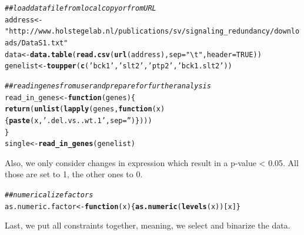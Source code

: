 \documentclass[paper=a4,notitlepage,DIV=12]{scrartcl}\usepackage[]{graphicx}\usepackage[]{color}
\makeatletter
\newcommand{\hlnum}[1]{\textcolor[rgb]{0.686,0.059,0.569}{#1}}%
\newcommand{\hlstr}[1]{\textcolor[rgb]{0.192,0.494,0.8}{#1}}%
\newcommand{\hlcom}[1]{\textcolor[rgb]{0.678,0.584,0.686}{\textit{#1}}}%
\newcommand{\hlstd}[1]{\textcolor[rgb]{0.345,0.345,0.345}{#1}}%
\newcommand{\hlkwa}[1]{\textcolor[rgb]{0.161,0.373,0.58}{\textbf{#1}}}%
\newcommand{\hlkwb}[1]{\textcolor[rgb]{0.69,0.353,0.396}{#1}}%
\newcommand{\hlkwc}[1]{\textcolor[rgb]{0.333,0.667,0.333}{#1}}%
\newcommand{\hlkwd}[1]{\textcolor[rgb]{0.737,0.353,0.396}{\textbf{#1}}}%
\newenvironment{kframe}{%
 \def\at@end@of@kframe{}%
 \ifinner\ifhmode%
  \def\at@end@of@kframe{\end{minipage}}%
  \begin{minipage}{\columnwidth}%
 \fi\fi%
 \def\FrameCommand##1{\hskip\@totalleftmargin \hskip-\fboxsep
 \colorbox{shadecolor}{##1}\hskip-\fboxsep
     \hskip-\linewidth \hskip-\@totalleftmargin \hskip\columnwidth}%
 \MakeFramed {\advance\hsize-\width
   \@totalleftmargin\z@ \linewidth\hsize
   \@setminipage}}%
 {\par\unskip\endMakeFramed%
 \at@end@of@kframe}
\newenvironment{knitrout}{}{} %
\makeatother
\begin{document}
\begin{knitrout}
\color{fgcolor}\begin{kframe}
\begin{alltt}
\hlcom{## load data file from local copy or from URL}
\hlstd{address} \hlkwb{<-}
  \hlstr{"http://www.holstegelab.nl/publications/sv/signaling_redundancy/downloads/DataS1.txt"}
\hlstd{data} \hlkwb{<-} \hlkwd{data.table}\hlstd{(}\hlkwd{read.csv}\hlstd{(}\hlkwd{url}\hlstd{(address),} \hlkwc{sep}\hlstd{=}\hlstr{"\textbackslash{}t"}\hlstd{,} \hlkwc{header}\hlstd{=}\hlnum{TRUE}\hlstd{))}
\hlstd{genelist} \hlkwb{<-} \hlkwd{toupper}\hlstd{(}\hlkwd{c}\hlstd{(}\hlstr{'bck1'}\hlstd{,} \hlstr{'slt2'}\hlstd{,} \hlstr{'ptp2'}\hlstd{,} \hlstr{'bck1.slt2'}\hlstd{))}

\hlcom{## read in genes from user and prepare for further analysis}
\hlstd{read_in_genes} \hlkwb{<-} \hlkwa{function}\hlstd{(}\hlkwc{genes}\hlstd{)\{}
  \hlkwd{return}\hlstd{(}\hlkwd{unlist}\hlstd{(}\hlkwd{lapply}\hlstd{(genes,} \hlkwa{function}\hlstd{(}\hlkwc{x}\hlstd{) \{}\hlkwd{paste}\hlstd{(x,} \hlstr{'.del.vs..wt.1'}\hlstd{,} \hlkwc{sep}\hlstd{=}\hlstr{''}\hlstd{)\})))}
\hlstd{\}}
\hlstd{single} \hlkwb{<-} \hlkwd{read_in_genes}\hlstd{(genelist)}
\end{alltt}
\end{kframe}
\end{knitrout}

Also, we only consider changes in expression which result in a p-value < 0.05. All those are set to 1, the other ones to 0.

\begin{knitrout}
\color{fgcolor}\begin{kframe}
\begin{alltt}
\hlcom{## numericalize factors}
\hlstd{as.numeric.factor} \hlkwb{<-} \hlkwa{function}\hlstd{(}\hlkwc{x}\hlstd{) \{}\hlkwd{as.numeric}\hlstd{(}\hlkwd{levels}\hlstd{(x))[x]\}}
\end{alltt}
\end{kframe}
\end{knitrout}

Last, we put all constraints together, meaning, we select and binarize the data.
\end{document}

